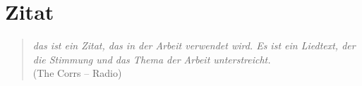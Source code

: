 \chapter*{Zitat}
\label{cha:Zitat}

\thispagestyle{empty}

\begin{center}
\begin{minipage}{14cm}
\begin{verse}
\textit{das ist ein Zitat, das in der Arbeit verwendet wird. Es ist ein Liedtext, der die Stimmung und das Thema der Arbeit unterstreicht.}\\

(The Corrs -- Radio)
\end{verse}
\end{minipage}
\end{center}
